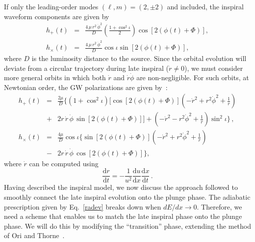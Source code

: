 \noindent If only the leading-order modes \((\ell,m)=(2, \pm 2)\) and included, the inspiral waveform components  are given by 
\begin{eqnarray}
h_{+}(t)&=& \frac{4\, \mu\,  r^2\, \dot{\phi}^2 }{D}\left(\frac{1+\cos^2 \iota}{2}\right)\cos\left[2(\phi(t) + \Phi)\right],\label{inspp}\\
h_{\times}(t)&=& \frac{4\, \mu\, r^2\, \dot{\phi}^2}{D} \cos\iota \sin\left[2(\phi(t) + \Phi)\right],
\label{inspc}
\end{eqnarray}
\noindent where \(D\) is the luminosity distance to the source. Since the
orbital evolution will deviate from a circular trajectory during late 
inspiral (\(\dot{r}\neq0\)), we must consider more general orbits in which
both \(\dot{r}\) and \(\dot{r}\dot{\phi}\) are non-negligible. For such orbits,
at Newtonian order, the GW polarizations are given by~\cite{Gopakumar:2002}:
\begin{eqnarray}
\label{insppcor}
h_{+}(t)&=& \frac{2 \mu }{D}\Bigg\{ \left(1+\cos^2 \iota\right) \Bigg[ \cos\left[2(\phi(t) + \Phi)\right]\left(-\dot{r}^2 + r^2 \dot{\phi}^2 + \frac{1}{r}\right) \nonumber \\ &+& 2r\,\dot{r}\,\dot{\phi}\,\sin\left[2(\phi(t) + \Phi)\right]\Bigg] + \left(-\dot{r}^2 - r^2\dot{\phi}^2 + \frac{1}{r}\right)\sin^2 \iota\Bigg\}\,,\\
\label{inspccorrected}
h_{\times}(t)&=&\frac{4 \mu }{D}\cos\iota\Bigg\{  \sin\left[2(\phi(t) + \Phi)\right]\left(-\dot{r}^2 + r^2 \dot{\phi}^2 + \frac{1}{r}\right) \nonumber \\ &-& 2r\,\dot{r}\,\dot{\phi}\,\cos\left[2(\phi(t) + \Phi)\right]\Bigg\},
\end{eqnarray}
\noindent where \(\dot{r}\) can be computed using
\begin{displaymath}
\frac{{\mathrm{d}}r}{{\mathrm{d}}t} = -\frac{1}{u^2}\frac{{\mathrm{d}u}}{{\mathrm{d}}x}\frac{{\mathrm{d}x}}{{\mathrm{d}}t}\, .
\end{displaymath}
Having described the inspiral model, we now discuss the approach followed to
smoothly connect the late inspiral evolution onto the plunge phase. The
adiabatic prescription given by Eq.~\eqref{radev} breaks down when 
\(dE/dx\rightarrow 0\). Therefore, we need a scheme that enables us to match
the late inspiral phase onto the plunge phase. We will do this by modifying 
the ``transition'' phase, extending the method of Ori and Thorne~\cite{amos}.


